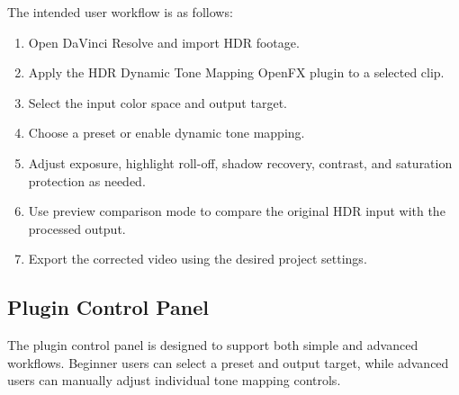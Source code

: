 \documentclass[12pt,hyphens]{article}
\begin{document}
The intended user workflow is as follows:

\begin{enumerate}[leftmargin=0.35in]
    \item Open DaVinci Resolve and import HDR footage.
    \item Apply the HDR Dynamic Tone Mapping OpenFX plugin to a selected clip.
    \item Select the input color space and output target.
    \item Choose a preset or enable dynamic tone mapping.
    \item Adjust exposure, highlight roll-off, shadow recovery, contrast, and saturation protection as needed.
    \item Use preview comparison mode to compare the original HDR input with the processed output.
    \item Export the corrected video using the desired project settings.
\end{enumerate}

\subsection{Plugin Control Panel}
The plugin control panel is designed to support both simple and advanced workflows. Beginner users can select a preset and output target, while advanced users can manually adjust individual tone mapping controls.
\end{document}
